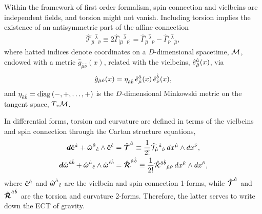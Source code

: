 \documentclass[twocolumn,showpacs,showkeys,prd,superscriptaddress]{revtex4-1}
\begin{document}
Within the framework of first order formalism, spin connection and vielbeins are independent fields, and  torsion might not vanish. Including torsion implies the existence of an antisymmetric part of the affine connection
\begin{align}
  \hat{\mathcal{T}}_{\hat{\mu}}{}^{\hat{\lambda}}{}_{\hat{\nu}} \equiv 2\hat{\Gamma}_{[\hat{\mu}}{}^{\hat{\lambda}}{}_{\hat{\nu}]} = \hat{\Gamma}_{\hat{\mu}}{}^{\hat{\lambda}}{}_{\hat{\nu}} - \hat{\Gamma}_{\hat{\nu}}{}^{\hat{\lambda}}{}_{\hat{\mu}},
\end{align}
where hatted  indices denote coordinates on a $D$-dimensional  spacetime, $\mathcal{M}$, endowed with a metric $\hat{g}_{\hat{\mu}\hat{\nu}}(x)$,  related with the vielbeins, $\hat{e}^{\hat{a}}_{\hat{\mu}}(x)$, via
\begin{equation}
  \label{metricrelation}
  \hat{g}_{\hat{\mu}\hat{\nu}}(x) = {\eta}_{\hat{a}\hat{b}}\,\hat{e}^{\hat{a}}_{\hat{\mu}}(x)\,\hat{e}^{\hat{b}}_{\hat{\nu}}(x),
\end{equation}
and ${\eta}_{\hat{a}\hat{b}} = \operatorname{diag}{\left(-,+,\ldots,+\right)}$ is the $D$-dimensional Minkowski metric on the tangent space, $T_x\mathcal{M}$.

In  differential forms,  torsion and curvature are defined in terms of the vielbeins and spin connection through the Cartan structure equations,
\begin{align}
  \label{cartantorsion}
  {\boldsymbol{d}}\hat{{\bf{e}}}^{\hat{a}_{}} + \hat{{\boldsymbol{\omega}}}^{\hat{a}}{}_{\hat{c}}\wedge\hat{{\bf{e}}}^{\hat{c}_{}} &= \hat{{\boldsymbol{\mathcal{T}}}}^{\hat{a}_{}} \equiv \frac{1}{2!}\hat{\mathcal{T}}_{\hat{\mu}}{}^{\hat{a}}{}_{\hat{\nu}}\,dx^{\hat{\mu}}\wedge dx^{\hat{\nu}}, \\
  \label{cartancurvature}
  {\boldsymbol{d}}\hat{{\boldsymbol{\omega}}}^{\hat{a}\hat{b}} + \hat{{\boldsymbol{\omega}}}^{\hat{a}}{}_{\hat{c}}\wedge\hat{{\boldsymbol{\omega}}}^{\hat{c}\hat{b}} &= \hat{{\boldsymbol{\mathcal{R}}}}^{\hat{a}_{}\hat{b}_{}} \equiv \frac{1}{2!}\hat{{\mathcal{R}}}^{\hat{a}\hat{b}}{}_{\hat{\mu}\hat{\nu}}\,dx^{\hat{\mu}}\wedge dx^{\hat{\nu}},
\end{align}
where $\hat{{\bf{e}}}^{\hat{a}_{}}$ and $\hat{{\boldsymbol{\omega}}}^{\hat{a}}{}_{\hat{c}}$ are the vielbein and spin connection 1-forms, while $\hat{{\boldsymbol{\mathcal{T}}}}^{\hat{a}_{}}$ and $\hat{{\boldsymbol{\mathcal{R}}}}^{\hat{a}_{}\hat{b}_{}}$ are the  torsion and curvature 2-forms. Therefore, the latter serves to write down the ECT of gravity.
\end{document}
